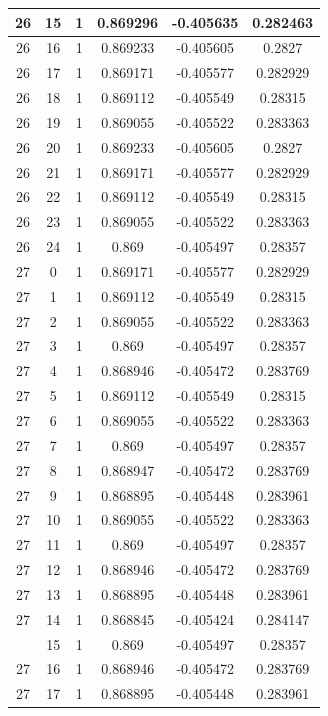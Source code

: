 \documentclass[12pt,a4paper]{article}
\numberwithin{equation}{section}
\numberwithin{figure}{section}
\numberwithin{table}{section}
\begin{document}
\begin{longtable}{|c|c|c|c|c|c|}
26 & 15 & 1 & 0.869296 & -0.405635 & 0.282463 \\ \hline
26 & 16 & 1 & 0.869233 & -0.405605 & 0.2827 \\ \hline
26 & 17 & 1 & 0.869171 & -0.405577 & 0.282929 \\ \hline
26 & 18 & 1 & 0.869112 & -0.405549 & 0.28315 \\ \hline
26 & 19 & 1 & 0.869055 & -0.405522 & 0.283363 \\ \hline
26 & 20 & 1 & 0.869233 & -0.405605 & 0.2827 \\ \hline
26 & 21 & 1 & 0.869171 & -0.405577 & 0.282929 \\ \hline
26 & 22 & 1 & 0.869112 & -0.405549 & 0.28315 \\ \hline
26 & 23 & 1 & 0.869055 & -0.405522 & 0.283363 \\ \hline
26 & 24 & 1 & 0.869 & -0.405497 & 0.28357 \\ \hline
27 & 0 & 1 & 0.869171 & -0.405577 & 0.282929 \\ \hline
27 & 1 & 1 & 0.869112 & -0.405549 & 0.28315 \\ \hline
27 & 2 & 1 & 0.869055 & -0.405522 & 0.283363 \\ \hline
27 & 3 & 1 & 0.869 & -0.405497 & 0.28357 \\ \hline
27 & 4 & 1 & 0.868946 & -0.405472 & 0.283769 \\ \hline
27 & 5 & 1 & 0.869112 & -0.405549 & 0.28315 \\ \hline
27 & 6 & 1 & 0.869055 & -0.405522 & 0.283363 \\ \hline
27 & 7 & 1 & 0.869 & -0.405497 & 0.28357 \\ \hline
27 & 8 & 1 & 0.868947 & -0.405472 & 0.283769 \\ \hline
27 & 9 & 1 & 0.868895 & -0.405448 & 0.283961 \\ \hline
27 & 10 & 1 & 0.869055 & -0.405522 & 0.283363 \\ \hline
27 & 11 & 1 & 0.869 & -0.405497 & 0.28357 \\ \hline
27 & 12 & 1 & 0.868946 & -0.405472 & 0.283769 \\ \hline
27 & 13 & 1 & 0.868895 & -0.405448 & 0.283961 \\ \hline
27 & 14 & 1 & 0.868845 & -0.405424 & 0.284147 \\ \hline
\pagebreak
27 & 15 & 1 & 0.869 & -0.405497 & 0.28357 \\ \hline
27 & 16 & 1 & 0.868946 & -0.405472 & 0.283769 \\ \hline
27 & 17 & 1 & 0.868895 & -0.405448 & 0.283961 \\ \hline

\end{longtable}
\end{document}

